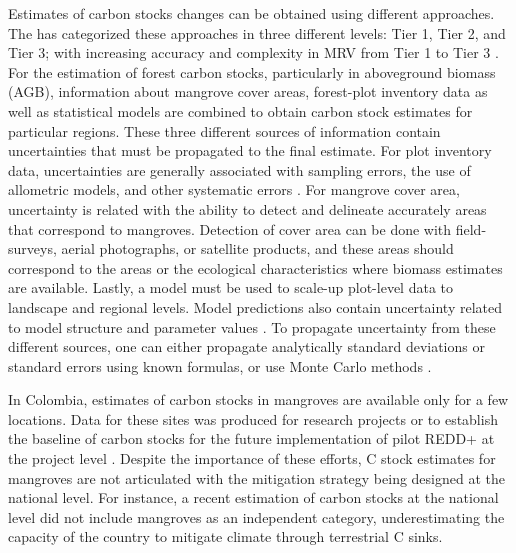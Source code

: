 \documentclass[review, authoryear]{elsarticle}   	%
\begin{document}
Estimates of carbon stocks changes can be obtained using different approaches. The \citet{IPCC2003, IPCC2006} has categorized these approaches in three different levels: Tier 1, Tier 2, and Tier 3; with increasing accuracy and complexity in MRV from Tier 1 to Tier 3 \citep{Maniatis2010}. 
For the estimation of forest carbon stocks, particularly in aboveground biomass (AGB), information about mangrove cover areas, forest-plot inventory data as well as statistical models are combined to obtain carbon stock estimates for particular regions. These three different sources of information contain uncertainties that must be propagated to the final estimate.  For plot inventory data, uncertainties are generally associated with sampling errors, the use of allometric models, and other systematic errors \citep{Chave2005, Sierra2007}. For mangrove cover area, uncertainty is related with the ability to detect and delineate accurately areas that correspond to mangroves. Detection of cover area can be done with field-surveys, aerial photographs, or satellite products, and these areas should correspond to the areas or the ecological characteristics where biomass estimates are available.  Lastly, a model must be used to scale-up plot-level data to landscape and regional levels. Model predictions also contain uncertainty related to model structure and parameter values \citep{IPCC2006}. To propagate uncertainty from these different sources, one can either propagate analytically standard deviations or standard errors using known formulas, or use Monte Carlo methods \citep{Chave2005, Sierra2007, IPCC2006}.


In Colombia, estimates of carbon stocks in mangroves are available only for a few locations. Data for these sites was produced for research projects or to establish the baseline of carbon stocks for the future implementation of pilot REDD+ at the project level \citep{Bolivar_inpreparation, Malaga2015}. Despite the importance of these efforts, C stock estimates for mangroves are not articulated with the mitigation strategy being designed at the national level. For instance,  a recent estimation of carbon stocks at the national level \citep{Phillips2011} did not include mangroves as an independent category, underestimating the capacity of the country to mitigate climate through terrestrial C sinks.
\end{document}
